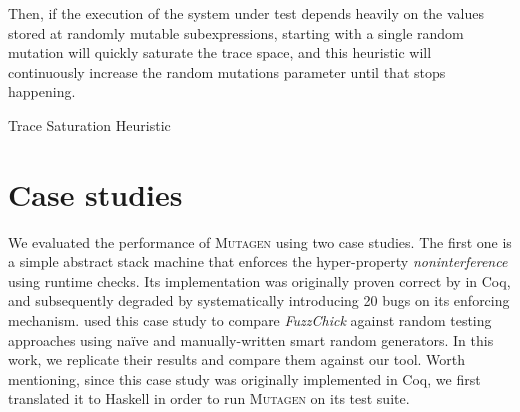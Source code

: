\documentclass[sigconf, anonymous, review]{acmart}
\newcommand{\fuzzchick}{\textit{FuzzChick}\xspace}
\newcommand{\mutagen}{\textsc{Mutagen}\xspace}
\begin{document}
Then, if the execution of the system under test depends heavily on the values
stored at randomly mutable subexpressions, starting with a single random
mutation will quickly saturate the trace space, and this heuristic will
continuously increase the random mutations parameter until that stops happening.

\begin{algorithm}
  \SetAlgoLined
  \DontPrintSemicolon

\caption{\label{algo:mutagen:reset}Trace Saturation Heuristic}
\end{algorithm}






\section{Case studies}
\label{sec:casestudies}

We evaluated the performance of \mutagen using two case studies.
%
The first one is a simple abstract stack machine that enforces the
hyper-property \emph{noninterference} \cite{goguen1982security} using runtime
checks.
%
Its implementation was originally proven correct by
\citeauthor{10.1145/2578855.2535839} \citeyearpar{10.1145/2578855.2535839} in
Coq, and subsequently degraded by systematically introducing 20 bugs on its
enforcing mechanism.
%
\citeauthor{lampropoulos2019coverage} used this case study to compare \fuzzchick
against random testing approaches using na\"ive and manually-written smart
random generators.
%
In this work, we replicate their results and compare them against our tool.
%
Worth mentioning, since this case study was originally implemented in Coq, we
first translated it to Haskell in order to run \mutagen on its test suite.
\end{document}
